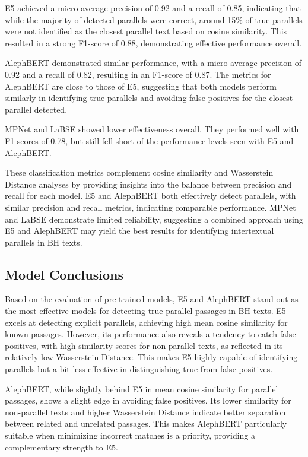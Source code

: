 \documentclass[12pt]{article}
\begin{document}
E5 achieved a micro average precision of 0.92 and a recall of 0.85, indicating that while the majority of detected parallels were correct, around 15\% of true parallels were not identified as the closest parallel text based on cosine similarity. This resulted in a strong F1-score of 0.88, demonstrating effective performance overall.

AlephBERT demonstrated similar performance, with a micro average precision of 0.92 and a recall of 0.82, resulting in an F1-score of 0.87. The metrics for AlephBERT are close to those of E5, suggesting that both models perform similarly in identifying true parallels and avoiding false positives for the closest parallel detected.

MPNet and LaBSE showed lower effectiveness overall. They performed well with F1-scores of 0.78, but still fell short of the performance levels seen with E5 and AlephBERT.

These classification metrics complement cosine similarity and Wasserstein Distance analyses by providing insights into the balance between precision and recall for each model. E5 and AlephBERT both effectively detect parallels, with similar precision and recall metrics, indicating comparable performance. MPNet and LaBSE demonstrate limited reliability, suggesting a combined approach using E5 and AlephBERT may yield the best results for identifying intertextual parallels in BH texts.

\subsection{Model Conclusions}
Based on the evaluation of pre-trained models, E5 and AlephBERT stand out as the most effective models for detecting true parallel passages in BH texts. E5 excels at detecting explicit parallels, achieving high mean cosine similarity for known passages. However, its performance also reveals a tendency to catch false positives, with high similarity scores for non-parallel texts, as reflected in its relatively low Wasserstein Distance. This makes E5 highly capable of identifying parallels but a bit less effective in distinguishing true from false positives.

AlephBERT, while slightly behind E5 in mean cosine similarity for parallel passages, shows a slight edge in avoiding false positives. Its lower similarity for non-parallel texts and higher Wasserstein Distance indicate better separation between related and unrelated passages. This makes AlephBERT particularly suitable when minimizing incorrect matches is a priority, providing a complementary strength to E5.
\end{document}
